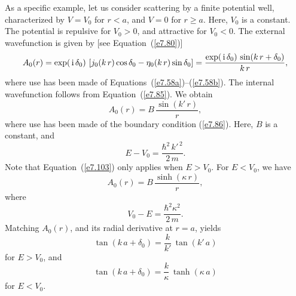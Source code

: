 As a specific example, let us consider scattering by  a finite
potential well, characterized by $V=V_0$ for $r<a$, and
$V=0$ for $r\geq a$. Here, $V_0$ is a constant. The potential
is repulsive for $V_0>0$, and attractive for $V_0<0$. 
The external  wavefunction is given by [see Equation~(\ref{e7.80})]
\begin{equation}
A_0(r) = \exp(\,{\rm i}\, \delta_0)\,\left[
j_0(k\,r) \cos\delta_0 - \eta_0(k\,r) \sin\delta_0\right]
= \frac{ \exp(\,{\rm i} \,\delta_0)\, \sin(k\,r+\delta_0)}{k\,r},
\end{equation}
where use has been made of Equations~(\ref{e7.58a})--(\ref{e7.58b}).
The internal wavefunction follows from Equation~(\ref{e7.85}). We obtain
\begin{equation}\label{e7.103}
A_0(r) = B \,\frac{\sin (k'\,r)}{r},
\end{equation}
where use has been made of the boundary condition (\ref{e7.86}).
Here, $B$ is a constant, and 
\begin{equation}
E - V_0 = \frac{\hbar^2 \,k'^{\,2}}{2\,m}.
\end{equation}
Note that Equation~(\ref{e7.103}) only applies when $E>V_0$. For $E<V_0$, we have
\begin{equation}
A_0(r) = B \,\frac{\sinh(\kappa\, r)}{r},
\end{equation}
where
\begin{equation}
V_0 - E = \frac{\hbar^2 \kappa^2}{2\,m}.
\end{equation}
Matching $A_0(r)$, and its radial derivative at $r=a$, yields
\begin{equation}\label{e7.107}
\tan(k\,a+\delta_0) = \frac{k}{k'} \,\tan (k'\,a)
\end{equation}
for $E>V_0$, and
\begin{equation}
\tan(k\,a+ \delta_0) = \frac{k}{\kappa} \,\tanh (\kappa\, a)
\end{equation}
for $E<V_0$.

